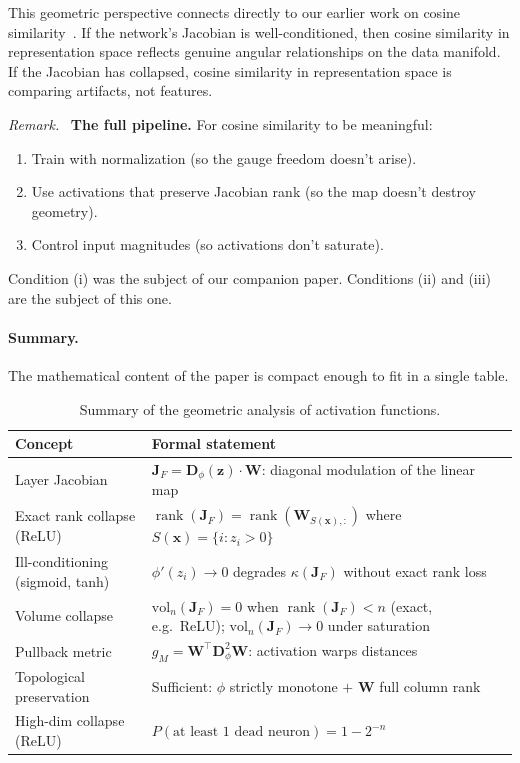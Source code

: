 \documentclass[11pt,a4paper]{article}
\theoremstyle{remark}
\newenvironment{keyresult}{\par\medskip\noindent\textit{Remark.}\ }{\par\medskip}
\begin{document}
This geometric perspective connects directly to our earlier work on cosine similarity~\cite{bouhsine2026cosine}.
If the network's Jacobian is well-conditioned, then cosine similarity in representation space reflects genuine angular relationships on the data manifold.
If the Jacobian has collapsed, cosine similarity in representation space is comparing artifacts, not features.

\begin{keyresult}
\textbf{The full pipeline.}  For cosine similarity to be meaningful:
\begin{enumerate}[label=(\roman*)]
  \item Train with normalization (so the gauge freedom doesn't arise).
  \item Use activations that preserve Jacobian rank (so the map doesn't destroy geometry).
  \item Control input magnitudes (so activations don't saturate).
\end{enumerate}
Condition (i) was the subject of our companion paper.  Conditions (ii) and (iii) are the subject of this one.
\end{keyresult}


\paragraph{Summary.}
The mathematical content of the paper is compact enough to fit in a single table.

\begin{table}[ht]
\centering
\renewcommand{\arraystretch}{1.3}
\begin{tabular}{@{} p{5.5cm} p{5.5cm} @{}}
\toprule
\textbf{Concept} & \textbf{Formal statement} \\
\midrule
Layer Jacobian &
$\mathbf{J}_F = \mathbf{D}_\phi(\mathbf{z}) \cdot \mathbf{W}$: diagonal modulation of the linear map \\[4pt]
Exact rank collapse (ReLU) &
$\operatorname{rank}(\mathbf{J}_F) = \operatorname{rank}(\mathbf{W}_{S(\mathbf{x}),:})$ where $S(\mathbf{x}) = \{i : z_i > 0\}$ \\[4pt]
Ill-conditioning (sigmoid, tanh) &
$\phi'(z_i) \to 0$ degrades $\kappa(\mathbf{J}_F)$ without exact rank loss \\[4pt]
Volume collapse &
$\mathrm{vol}_n(\mathbf{J}_F) = 0$ when $\operatorname{rank}(\mathbf{J}_F) < n$ (exact, e.g.\ ReLU); $\mathrm{vol}_n(\mathbf{J}_F) \to 0$ under saturation \\[4pt]
Pullback metric &
$g_M = \mathbf{W}^\top \mathbf{D}_\phi^2 \mathbf{W}$: activation warps distances \\[4pt]
Topological preservation &
Sufficient: $\phi$ strictly monotone $+$ $\mathbf{W}$ full column rank \\[4pt]
High-dim collapse (ReLU) &
$P(\text{at least 1 dead neuron}) = 1 - 2^{-n}$ \\
\bottomrule
\end{tabular}
\caption{Summary of the geometric analysis of activation functions.}
\label{tab:summary}
\end{table}
\end{document}
